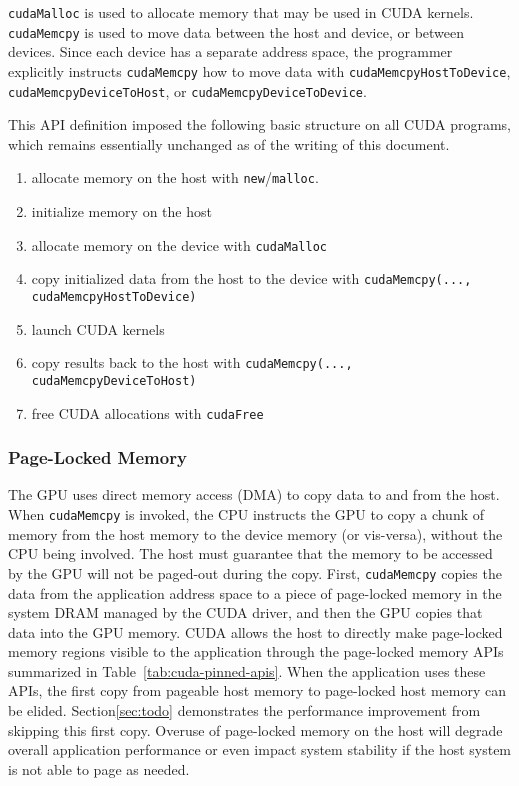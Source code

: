\texttt{cudaMalloc} is used to allocate memory that may be used in CUDA kernels.
\texttt{cudaMemcpy} is used to move data between the host and device, or between devices.
Since each device has a separate address space, the programmer explicitly instructs \texttt{cudaMemcpy} how to move data with \texttt{cudaMemcpyHostToDevice}, \texttt{cudaMemcpyDeviceToHost}, or \texttt{cudaMemcpyDeviceToDevice}.

This API definition imposed the following basic structure on all CUDA programs, which remains essentially unchanged as of the writing of this document.
\begin{enumerate}
    \item allocate memory on the host with \texttt{new}/\texttt{malloc}.
    \item initialize memory on the host
    \item allocate memory on the device with \texttt{cudaMalloc}
    \item copy initialized data from the host to the device with \texttt{cudaMemcpy(..., cudaMemcpyHostToDevice)}
    \item launch CUDA kernels
    \item copy results back to the host with \texttt{cudaMemcpy(..., cudaMemcpyDeviceToHost)}
    \item free CUDA allocations with \texttt{cudaFree}
\end{enumerate}


\subsubsection{Page-Locked Memory}

The GPU uses direct memory access (DMA) to copy data to and from the host.
When \texttt{cudaMemcpy} is invoked, the CPU instructs the GPU to copy a chunk of memory from the host memory to the device memory (or vis-versa), without the CPU being involved.
The host must guarantee that the memory to be accessed by the GPU will not be paged-out during the copy.
First, \texttt{cudaMemcpy} copies the data from the application address space to a piece of page-locked memory in the system DRAM managed by the CUDA driver, and then the GPU copies that data into the GPU memory.
CUDA allows the host to directly make page-locked memory regions visible to the application through the page-locked memory APIs summarized in Table~\ref{tab:cuda-pinned-apis}.
When the application uses these APIs, the first copy from pageable host memory to page-locked host memory can be elided.
Section{\ref{sec:todo}} demonstrates the performance improvement from skipping this first copy.
Overuse of page-locked memory on the host will degrade overall application performance or even impact system stability if the host system is not able to page as needed.

